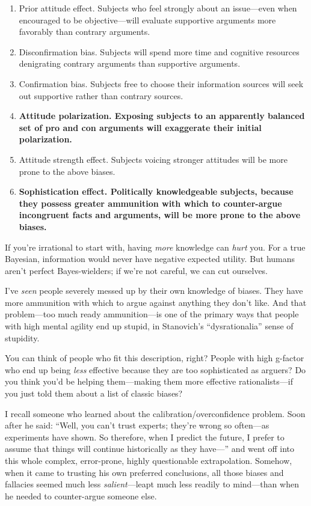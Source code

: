 \begin{enumerate}
\item {
 Prior attitude effect. Subjects who feel strongly about an
issue---even when encouraged to be objective---will evaluate supportive
arguments more favorably than contrary arguments.}

\item {
 Disconfirmation bias. Subjects will spend more time and cognitive
resources denigrating contrary arguments than supportive arguments.}

\item {
 Confirmation bias. Subjects free to choose their information
sources will seek out supportive rather than contrary sources.}

\item {
 \textbf{Attitude polarization. Exposing subjects to an apparently
balanced set of pro and con arguments will exaggerate their initial
polarization.}}

\item {
 Attitude strength effect. Subjects voicing stronger attitudes will
be more prone to the above biases.}

\item  {
 \textbf{Sophistication effect. Politically knowledgeable subjects,
because they possess greater ammunition with which to counter-argue
incongruent facts and arguments, will be more prone to the above
biases.}}
\end{enumerate}

{
 If you're irrational to start with, having
\textit{more} knowledge can \textit{hurt} you. For a true Bayesian,
information would never have negative expected utility. But humans
aren't perfect Bayes-wielders; if we're
not careful, we can cut ourselves.}

{
 I've \textit{seen} people severely messed up by
their own knowledge of biases. They have more ammunition with which to
argue against anything they don't like. And that
problem---too much ready ammunition---is one of the primary ways that
people with high mental agility end up stupid, in
Stanovich's
``dysrationalia'' sense of
stupidity.}

{
 You can think of people who fit this description, right? People
with high g-factor who end up being \textit{less} effective because
they are too sophisticated as arguers? Do you think
you'd be helping them---making them more effective
rationalists---if you just told them about a list of classic biases?}

{
 I recall someone who learned about the calibration/overconfidence
problem. Soon after he said: ``Well, you
can't trust experts; they're wrong so
often---as experiments have shown. So therefore, when I predict the
future, I prefer to assume that things will continue historically as
they have---'' and went off into this whole complex,
error-prone, highly questionable extrapolation. Somehow, when it came
to trusting his own preferred conclusions, all those biases and
fallacies seemed much less \textit{salient}{}---leapt much less readily
to mind---than when he needed to counter-argue someone else.}

